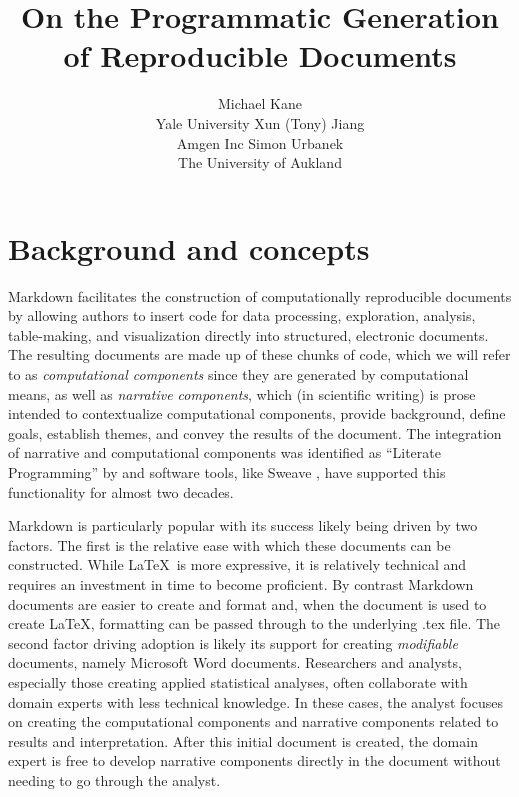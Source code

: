 \documentclass[
]{jss}
\author{
Michael Kane\\Yale University \And Xun (Tony) Jiang\\Amgen
Inc \And Simon Urbanek\\The University of Aukland
}
\title{On the Programmatic Generation of Reproducible Documents}
\begin{document}
\hypertarget{background-and-concepts}{%
\section{Background and concepts}\label{background-and-concepts}}

 Markdown \citep{baumer2014} facilitates the construction of
computationally reproducible documents by allowing authors to insert
 code for data processing, exploration, analysis,
table-making, and visualization directly into structured, electronic
documents. The resulting documents are made up of these chunks of
 code, which we will refer to as \emph{computational
components} since they are generated by computational means, as well as
\emph{narrative components}, which (in scientific writing) is prose
intended to contextualize computational components, provide background,
define goals, establish themes, and convey the results of the document.
The integration of narrative and computational components was identified
as ``Literate Programming'' by \citet{knuth1984} and software tools,
like Sweave \citep{leisch2002}, have supported this functionality for
almost two decades.

 Markdown is particularly popular with its success likely
being driven by two factors. The first is the relative ease with which
these documents can be constructed. While \LaTeX ~is more expressive, it
is relatively technical and requires an investment in time to become
proficient. By contrast  Markdown documents are easier to
create and format and, when the document is used to create \LaTeX,
formatting can be passed through to the underlying .tex file. The second
factor driving adoption is likely its support for creating
\emph{modifiable} documents, namely Microsoft Word documents.
Researchers and analysts, especially those creating applied statistical
analyses, often collaborate with domain experts with less technical
knowledge. In these cases, the analyst focuses on creating the
computational components and narrative components related to results and
interpretation. After this initial document is created, the domain
expert is free to develop narrative components directly in the document
without needing to go through the analyst.
\end{document}
